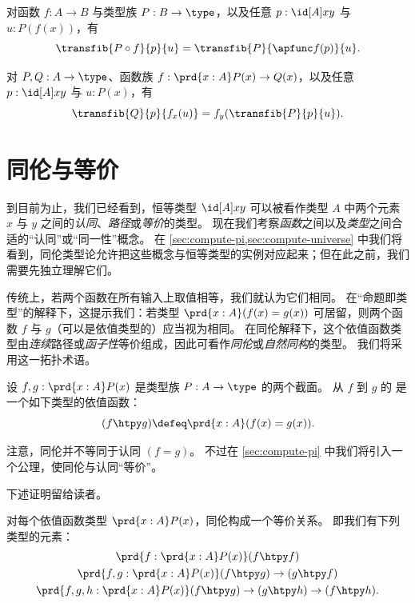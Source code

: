 \begin{lem}\label{thm:transport-compose}
  对函数 $f:A\to B$ 与类型族 $P:B\to\type$，以及任意 $p:\id[A]xy$ 与 $u:P(f(x))$，有
  \[ \transfib{P\circ f}{p}{u} = \transfib{P}{\apfunc f(p)}{u}. \]
\end{lem}

\begin{lem}\label{thm:ap-transport}
  对 $P,Q:A\to \type$、函数族 $f:\prd{x:A} P(x)\to Q(x)$，以及任意 $p:\id[A]xy$ 与 $u:P(x)$，有
  \[ \transfib{Q}{p}{f_x(u)} = f_y(\transfib{P}{p}{u}). \]
\end{lem}

%
\section{同伦与等价}
\label{sec:basics-equivalences}

%

到目前为止，我们已经看到，恒等类型 $\id[A]xy$ 可以被看作类型 $A$ 中两个元素 $x$ 与 $y$ 之间的\emph{认同}、\emph{路径}或\emph{等价}的类型。
现在我们考察\emph{函数}之间以及\emph{类型}之间合适的“认同”或“同一性”概念。
在 \cref{sec:compute-pi,sec:compute-universe} 中我们将看到，同伦类型论允许把这些概念与恒等类型的实例对应起来；但在此之前，我们需要先独立理解它们。

传统上，若两个函数在所有输入上取值相等，我们就认为它们相同。
在“命题即类型”的解释下，这提示我们：若类型 $\prd{x:A} (f(x)=g(x))$ 可居留，则两个函数 $f$ 与 $g$（可以是依值类型的）应当视为相同。
在同伦解释下，这个依值函数类型由\emph{连续}路径或\emph{函子性}等价组成，因此可看作\emph{同伦}或\emph{自然同构}的类型。
我们将采用这一拓扑术语。

\begin{defn} \label{defn:homotopy}
  设 $f,g:\prd{x:A} P(x)$ 是类型族 $P:A\to\type$ 的两个截面。
  从 $f$ 到 $g$ 的
  是一个如下类型的依值函数：
  \begin{equation*}
    (f\htpy g) \defeq \prd{x:A} (f(x)=g(x)).
  \end{equation*}
\end{defn}

注意，同伦并不等同于认同 $(f=g)$。
不过在 \cref{sec:compute-pi} 中我们将引入一个公理，使同伦与认同“等价”。

下述证明留给读者。

\begin{lem}\label{lem:homotopy-props}
  对每个依值函数类型 $\prd{x:A} P(x)$，同伦构成一个等价关系。
  即我们有下列类型的元素：
  \begin{gather*}
    \prd{f:\prd{x:A} P(x)} (f\htpy f)\\
    \prd{f,g:\prd{x:A} P(x)} (f\htpy g) \to (g\htpy f)\\
    \prd{f,g,h:\prd{x:A} P(x)} (f\htpy g) \to (g\htpy h) \to (f\htpy h).
  \end{gather*}
\end{lem}

